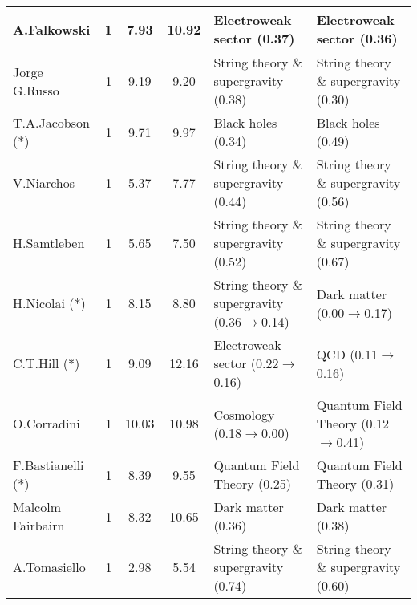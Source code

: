 \begin{table}[H]
\begin{tabular}{p{}|c|c|c|b{}|b{}}
           A.Falkowski &     1 &          7.93 &         10.92 &                     Electroweak sector (0.37) &                     Electroweak sector (0.36)\\ \hline
         Jorge G.Russo &     1 &          9.19 &          9.20 &          String theory \& supergravity (0.38) &          String theory \& supergravity (0.30)\\ \hline
 T.A.Jacobson ($\ast$) &     1 &          9.71 &          9.97 &                            Black holes (0.34) &                            Black holes (0.49)\\ \hline
            V.Niarchos &     1 &          5.37 &          7.77 &          String theory \& supergravity (0.44) &          String theory \& supergravity (0.56)\\ \hline
           H.Samtleben &     1 &          5.65 &          7.50 &          String theory \& supergravity (0.52) &          String theory \& supergravity (0.67)\\ \hline
    H.Nicolai ($\ast$) &     1 &          8.15 &          8.80 & String theory \& supergravity (0.36$\to$0.14) &                   Dark matter (0.00$\to$0.17)\\ \hline
     C.T.Hill ($\ast$) &     1 &          9.09 &         12.16 &            Electroweak sector (0.22$\to$0.16) &                           QCD (0.11$\to$0.16)\\ \hline
           O.Corradini &     1 &         10.03 &         10.98 &                     Cosmology (0.18$\to$0.00) &          Quantum Field Theory (0.12$\to$0.41)\\ \hline
F.Bastianelli ($\ast$) &     1 &          8.39 &          9.55 &                   Quantum Field Theory (0.25) &                   Quantum Field Theory (0.31)\\ \hline
     Malcolm Fairbairn &     1 &          8.32 &         10.65 &                            Dark matter (0.36) &                            Dark matter (0.38)\\ \hline
          A.Tomasiello &     1 &          2.98 &          5.54 &          String theory \& supergravity (0.74) &          String theory \& supergravity (0.60)\\ \hline
\bottomrule
\end{tabular}
\end{table}

